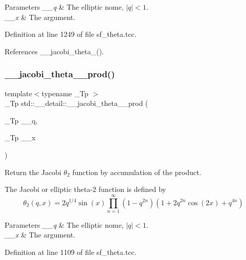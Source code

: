 \begin{DoxyParams}{Parameters}
{\em \+\_\+\+\_\+q} & The elliptic nome, $ |q| < 1 $. \\
\hline
{\em \+\_\+\+\_\+x} & The argument. \\
\hline
\end{DoxyParams}


Definition at line 1249 of file sf\+\_\+theta.\+tcc.



References \+\_\+\+\_\+jacobi\+\_\+theta\+\_().

\mbox{\label{namespacestd_1_1____detail_acc790f257c25f021704f9c9e1ad9df29}} 
\subsubsection{\texorpdfstring{\+\_\+\+\_\+jacobi\+\_\+theta\+\_\+\_\+prod()}{\_\_jacobi\_theta\_2\_prod()}}
{\footnotesize\ttfamily template$<$typename \+\_\+\+Tp $>$ \\
\+\_\+\+Tp std\+::\+\_\+\+\_\+detail\+::\+\_\+\+\_\+jacobi\+\_\+theta\+\_\+\_\+prod (\begin{DoxyParamCaption}\item[{\+\_\+\+Tp}]{\+\_\+\+\_\+q,  }\item[{\+\_\+\+Tp}]{\+\_\+\+\_\+x }\end{DoxyParamCaption})}

Return the Jacobi $ \theta_2 $ function by accumulation of the product.

The Jacobi or elliptic theta-\/2 function is defined by \[ \theta_2(q,x) = 2 q^{1/4} \sin(x) \prod_{n=1}^{\infty} (1 - q^{2n})(1 + 2q^{2n}\cos(2x) + q^{4n}) \]


\begin{DoxyParams}{Parameters}
{\em \+\_\+\+\_\+q} & The elliptic nome, $ |q| < 1 $. \\
\hline
{\em \+\_\+\+\_\+x} & The argument. \\
\hline
\end{DoxyParams}


Definition at line 1109 of file sf\+\_\+theta.\+tcc.



